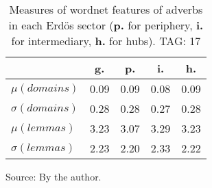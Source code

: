 \begin{table}[h!]
\begin{center}
\caption{Measures of wordnet features of adverbs in each Erd\"os sector ({{\bf p.}} for periphery, {{\bf i.}} for intermediary, {{\bf h.}} for hubs). TAG: 17}
	\label{tab:wnr}
\begin{tabular}{| l || c | c | c | c |}\hline
 & {\bf g.} & {\bf p.} & {\bf i.} & {\bf h.} \\\hline\hline
$\mu(domains)$ & 0.09  & 0.09  & 0.08  & 0.09 \\
$\sigma(domains)$ & 0.28  & 0.28  & 0.27  & 0.28 \\\hline
$\mu(lemmas)$ & 3.23  & 3.07  & 3.29  & 3.23 \\
$\sigma(lemmas)$ & 2.23  & 2.20  & 2.33  & 2.22 \\\hline
\end{tabular}
\begin{flushleft}
		Source: By the author.\
\end{flushleft}
\end{center}
\end{table}
